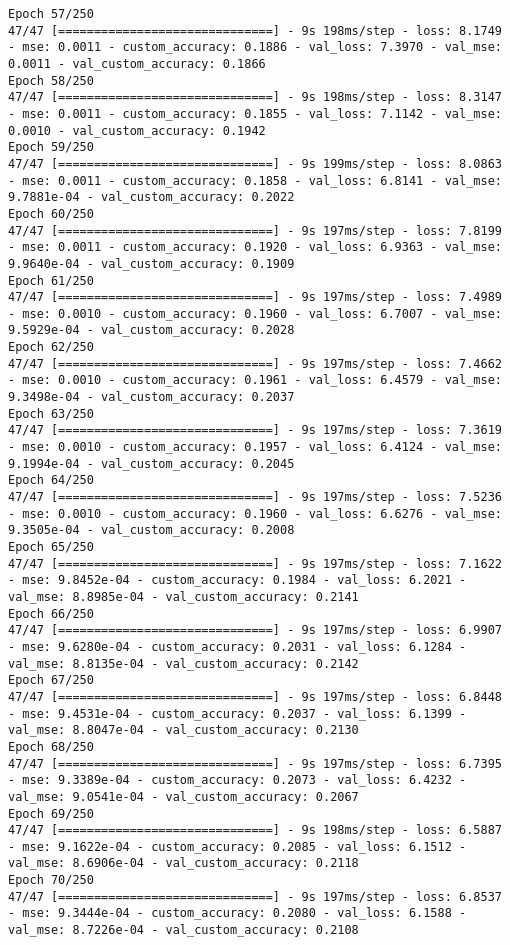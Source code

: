\begin{lstlisting}
Epoch 57/250
47/47 [==============================] - 9s 198ms/step - loss: 8.1749 - mse: 0.0011 - custom_accuracy: 0.1886 - val_loss: 7.3970 - val_mse: 0.0011 - val_custom_accuracy: 0.1866
Epoch 58/250
47/47 [==============================] - 9s 198ms/step - loss: 8.3147 - mse: 0.0011 - custom_accuracy: 0.1855 - val_loss: 7.1142 - val_mse: 0.0010 - val_custom_accuracy: 0.1942
Epoch 59/250
47/47 [==============================] - 9s 199ms/step - loss: 8.0863 - mse: 0.0011 - custom_accuracy: 0.1858 - val_loss: 6.8141 - val_mse: 9.7881e-04 - val_custom_accuracy: 0.2022
Epoch 60/250
47/47 [==============================] - 9s 197ms/step - loss: 7.8199 - mse: 0.0011 - custom_accuracy: 0.1920 - val_loss: 6.9363 - val_mse: 9.9640e-04 - val_custom_accuracy: 0.1909
Epoch 61/250
47/47 [==============================] - 9s 197ms/step - loss: 7.4989 - mse: 0.0010 - custom_accuracy: 0.1960 - val_loss: 6.7007 - val_mse: 9.5929e-04 - val_custom_accuracy: 0.2028
Epoch 62/250
47/47 [==============================] - 9s 197ms/step - loss: 7.4662 - mse: 0.0010 - custom_accuracy: 0.1961 - val_loss: 6.4579 - val_mse: 9.3498e-04 - val_custom_accuracy: 0.2037
Epoch 63/250
47/47 [==============================] - 9s 197ms/step - loss: 7.3619 - mse: 0.0010 - custom_accuracy: 0.1957 - val_loss: 6.4124 - val_mse: 9.1994e-04 - val_custom_accuracy: 0.2045
Epoch 64/250
47/47 [==============================] - 9s 197ms/step - loss: 7.5236 - mse: 0.0010 - custom_accuracy: 0.1960 - val_loss: 6.6276 - val_mse: 9.3505e-04 - val_custom_accuracy: 0.2008
Epoch 65/250
47/47 [==============================] - 9s 197ms/step - loss: 7.1622 - mse: 9.8452e-04 - custom_accuracy: 0.1984 - val_loss: 6.2021 - val_mse: 8.8985e-04 - val_custom_accuracy: 0.2141
Epoch 66/250
47/47 [==============================] - 9s 197ms/step - loss: 6.9907 - mse: 9.6280e-04 - custom_accuracy: 0.2031 - val_loss: 6.1284 - val_mse: 8.8135e-04 - val_custom_accuracy: 0.2142
Epoch 67/250
47/47 [==============================] - 9s 197ms/step - loss: 6.8448 - mse: 9.4531e-04 - custom_accuracy: 0.2037 - val_loss: 6.1399 - val_mse: 8.8047e-04 - val_custom_accuracy: 0.2130
Epoch 68/250
47/47 [==============================] - 9s 197ms/step - loss: 6.7395 - mse: 9.3389e-04 - custom_accuracy: 0.2073 - val_loss: 6.4232 - val_mse: 9.0541e-04 - val_custom_accuracy: 0.2067
Epoch 69/250
47/47 [==============================] - 9s 198ms/step - loss: 6.5887 - mse: 9.1622e-04 - custom_accuracy: 0.2085 - val_loss: 6.1512 - val_mse: 8.6906e-04 - val_custom_accuracy: 0.2118
Epoch 70/250
47/47 [==============================] - 9s 197ms/step - loss: 6.8537 - mse: 9.3444e-04 - custom_accuracy: 0.2080 - val_loss: 6.1588 - val_mse: 8.7226e-04 - val_custom_accuracy: 0.2108

\end{lstlisting}
